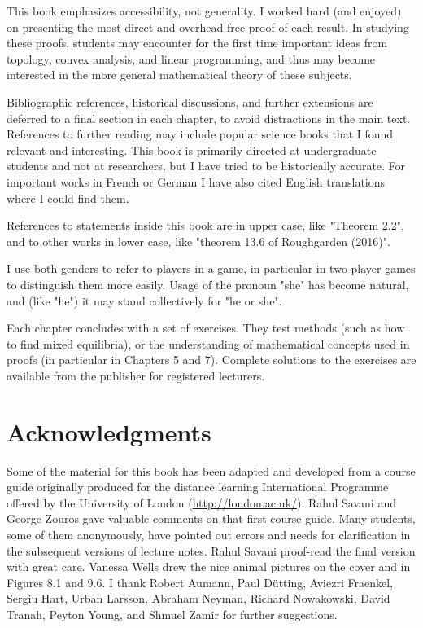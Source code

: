 \documentclass[12pt]{article}
\begin{document}
This book emphasizes accessibility, not generality. I worked hard (and enjoyed) on presenting the most direct and overhead-free proof of each result. In studying these proofs, students may encounter for the first time important ideas from topology, convex analysis, and linear programming, and thus may become interested in the more general mathematical theory of these subjects.

Bibliographic references, historical discussions, and further extensions are deferred to a final section in each chapter, to avoid distractions in the main text. References to further reading may include popular science books that I found relevant and interesting. This book is primarily directed at undergraduate students and not at researchers, but I have tried to be historically accurate. For important works in French or German I have also cited English translations where I could find them.

References to statements inside this book are in upper case, like "Theorem 2.2", and to other works in lower case, like "theorem 13.6 of Roughgarden (2016)".

I use both genders to refer to players in a game, in particular in two-player games to distinguish them more easily. Usage of the pronoun "she" has become natural, and (like "he") it may stand collectively for "he or she".

Each chapter concludes with a set of exercises. They test methods (such as how to find mixed equilibria), or the understanding of mathematical concepts used in proofs (in particular in Chapters 5 and 7). Complete solutions to the exercises are available from the publisher for registered lecturers.

\section*{Acknowledgments}
Some of the material for this book has been adapted and developed from a course guide originally produced for the distance learning International Programme offered by the University of London (\href{http://london.ac.uk/}{http://london.ac.uk/}). Rahul Savani and George Zouros gave valuable comments on that first course guide. Many students, some of them anonymously, have pointed out errors and needs for clarification in the subsequent versions of lecture notes. Rahul Savani proof-read the final version with great care. Vanessa Wells drew the nice animal pictures on the cover and in Figures 8.1 and 9.6. I thank Robert Aumann, Paul Dütting, Aviezri Fraenkel, Sergiu Hart, Urban Larsson, Abraham Neyman, Richard Nowakowski, David Tranah, Peyton Young, and Shmuel Zamir for further suggestions.
\end{document}
